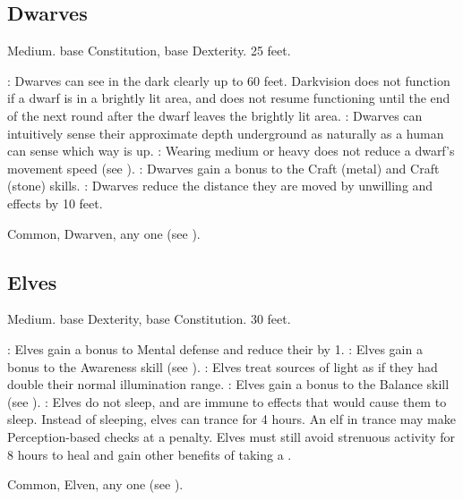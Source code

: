    \subsection{Dwarves}
         Medium.
          base Constitution,  base Dexterity.
         25 feet.
        \begin{itemize}
            : Dwarves can see in the dark clearly up to 60 feet. Darkvision does not function if a dwarf is in a brightly lit area, and does not resume functioning until the end of the next round after the dwarf leaves the brightly lit area.
            : Dwarves can intuitively sense their approximate depth underground as naturally as a human can sense which way is up.
            : Wearing medium or heavy  does not reduce a dwarf's movement speed (see ).
            : Dwarves gain a  bonus to the Craft (metal) and Craft (stone) skills.
            : Dwarves reduce the distance they are moved by unwilling  and  effects by 10 feet.
        \end{itemize}
         Common, Dwarven, any one  (see ).

    \subsection{Elves}
         Medium.
          base Dexterity,  base Constitution.
         30 feet.
        \begin{itemize}
            : Elves gain a  bonus to Mental defense and reduce their  by 1.
            : Elves gain a  bonus to the Awareness skill (see ).
            : Elves treat sources of light as if they had double their normal illumination range.
            : Elves gain a  bonus to the Balance skill (see ).
            : Elves do not sleep, and are immune to  effects that would cause them to sleep.
                Instead of sleeping, elves can trance for 4 hours.
                An elf in trance may make Perception-based checks at a  penalty.
                Elves must still avoid strenuous activity for 8 hours to heal and gain other benefits of taking a .
        \end{itemize}
         Common, Elven, any one  (see ).

